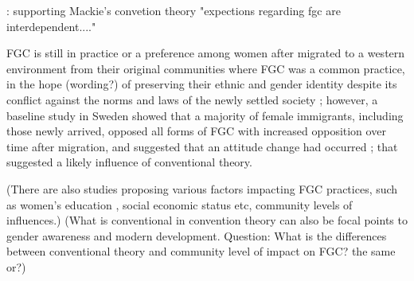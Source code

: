 \documentclass[12pt,]{article}
\begin{document}




 \cite{Shel-Wand11}:  supporting Mackie's convetion theory "expections regarding fgc are interdependent...."




FGC is still in practice or a preference among women after migrated to a western environment from their original communities where FGC was a common practice, in the hope (wording?) of preserving their ethnic and gender identity despite its conflict against the  norms and laws of the newly settled society \cite{}; however, a baseline study in Sweden showed that a majority of female immigrants, including those newly arrived, opposed all forms of FGC with increased opposition over time after migration, and suggested that an attitude change had occurred \cite{WahlJohn17}; that suggested a likely influence of conventional theory.


(There are also studies proposing various factors impacting FGC practices, such as women's education \cite{KandNwak09,VanMeek15}, social economic status \cite{} etc, community levels of influences.) (What is conventional in convention theory can also be focal points to gender awareness and modern development.  Question:  What is the differences between conventional theory and community level of impact on FGC? the same or?)  



\end{document}
